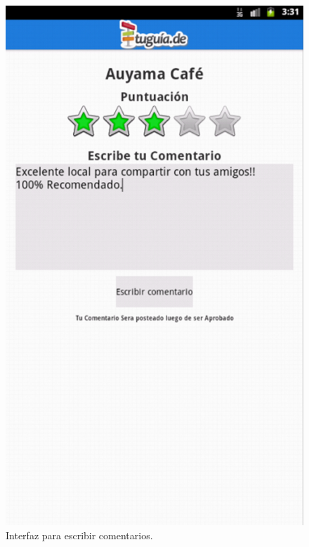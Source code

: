 \begin{figure}[h]
	\begin{center}
		\includegraphics[scale=0.4]{imagenes/escribir_coment.png}
	\end{center}
	\caption{
		\label{img:comentario}
		Interfaz para escribir comentarios.
	}
\end{figure}


